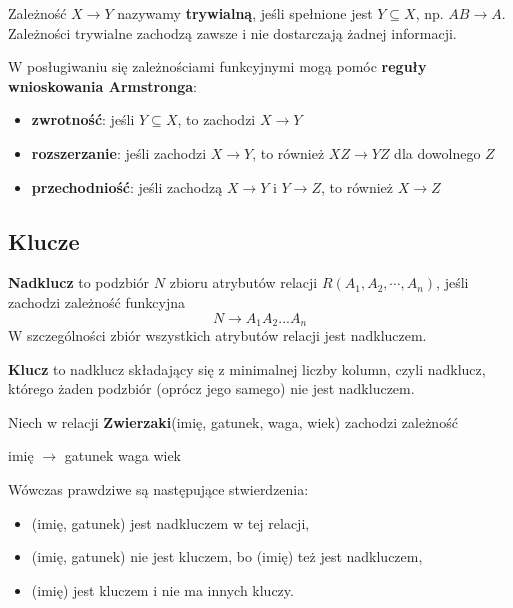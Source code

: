 Zależność $X \to Y$ nazywamy \textbf{trywialną}, jeśli spełnione jest $Y \subseteq X$, np. $AB \to A$. Zależności trywialne zachodzą zawsze i nie dostarczają żadnej informacji.
\bigskip

W posługiwaniu się zależnościami funkcyjnymi mogą pomóc \textbf{reguły wnioskowania Armstronga}:
\begin{itemize}
    \item \textbf{zwrotność}: jeśli $Y \subseteq X$, to zachodzi $X \to Y$ 
    \item \textbf{rozszerzanie}: jeśli zachodzi $X \to Y$, to również $XZ \to YZ$ dla dowolnego $Z$
    \item \textbf{przechodniość}: jeśli zachodzą $X \to Y$ i $Y\to Z$, to również $X \to Z$
\end{itemize}

\subsection{Klucze}

\textbf{Nadklucz} to podzbiór $N$ zbioru atrybutów relacji $R(A_1, A_2, \cdots, A_n)$, jeśli zachodzi zależność funkcyjna
$$
N \to A_1A_2...A_n
$$
W szczególności zbiór wszystkich atrybutów relacji jest nadkluczem.

\textbf{Klucz} to nadklucz składający się z minimalnej liczby kolumn, czyli nadklucz, którego żaden podzbiór (oprócz jego samego) nie jest nadkluczem.

\begin{example}
Niech w relacji \textbf{Zwierzaki}(imię, gatunek, waga, wiek) zachodzi zależność
\begin{center}
    imię $\to$ gatunek waga wiek
\end{center}
Wówczas prawdziwe są następujące stwierdzenia:
\begin{itemize}
    \item (imię, gatunek) jest nadkluczem w tej relacji,
    \item (imię, gatunek) nie jest kluczem, bo (imię) też jest nadkluczem,
    \item (imię) jest kluczem i nie ma innych kluczy.
\end{itemize}
\end{example}

